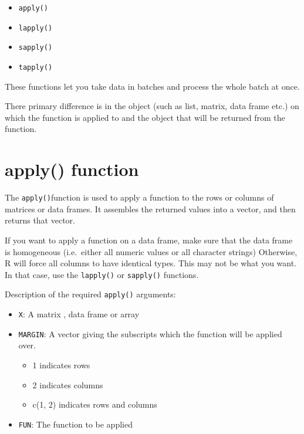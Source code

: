\documentclass[
]{book}
\providecommand{\tightlist}{%
  \setlength{\itemsep}{0pt}\setlength{\parskip}{0pt}}
\begin{document}
\begin{itemize}
\tightlist
\item
  \texttt{apply()}
\item
  \texttt{lapply()}
\item
  \texttt{sapply()}
\item
  \texttt{tapply()}
\end{itemize}

These functions let you take data in batches and process the whole batch at once.

There primary difference is in the object (such as list, matrix, data frame etc.) on which the function is applied to and the object that will be returned from the function.

\hypertarget{apply-function}{%
\section{apply() function}\label{apply-function}}

The \texttt{apply()}function is used to apply a function to the rows or columns of matrices or data frames. It assembles the returned values into a vector, and then returns that vector.

If you want to apply a function on a data frame, make sure that the data frame is homogeneous (i.e.~either all numeric values or all character strings) Otherwise, R will force all columns to have identical types. This may not be what you want. In that case, use the \texttt{lapply()} or \texttt{sapply()} functions.

Description of the required \texttt{apply()} arguments:

\begin{itemize}
\tightlist
\item
  \texttt{X}: A matrix , data frame or array
\item
  \texttt{MARGIN}: A vector giving the subscripts which the function will be applied over.

  \begin{itemize}
  \tightlist
  \item
    1 indicates rows
  \item
    2 indicates columns
  \item
    c(1, 2) indicates rows and columns
  \end{itemize}
\item
  \texttt{FUN}: The function to be applied
\end{itemize}
\end{document}
